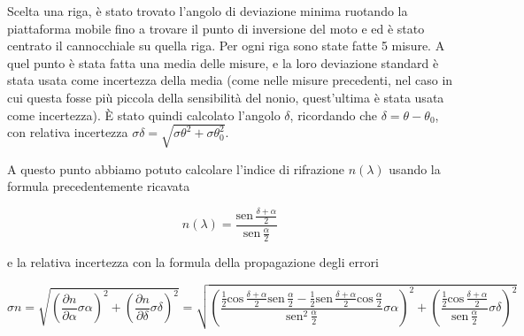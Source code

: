 \documentclass{article}
\begin{document}
Scelta una riga, è stato trovato l'angolo di deviazione minima ruotando la piattaforma mobile fino a trovare il punto di inversione del moto e ed è stato centrato il cannocchiale su quella riga. Per ogni riga sono state fatte 5 misure. A quel punto è stata fatta una media delle misure, e la loro deviazione standard è stata usata come incertezza della media (come nelle misure precedenti, nel caso in cui questa fosse più piccola della sensibilità del nonio, quest'ultima è stata usata come incertezza). È stato quindi calcolato l'angolo $\delta$, ricordando che $\delta = \theta - \theta _0$, con relativa incertezza $\sigma \delta = \sqrt{\sigma \theta ^2 + \sigma \theta_0 ^2}$.

A questo punto abbiamo potuto calcolare l'indice di rifrazione $n (\lambda)$ usando la formula precedentemente ricavata

\[n(\lambda) = \frac{\textrm{sen}\, \frac{\delta + \alpha}{2}}{\textrm{sen}\, \frac{\alpha}{2}}\]

 e la relativa incertezza con la formula della propagazione degli errori

\[\sigma n = \sqrt{\left( \frac{\partial n}{\partial \alpha}\sigma \alpha \right)^2 + \left( \frac{\partial n}{\partial \delta}\sigma \delta \right)^2} = \sqrt{\left( \frac{\frac{1}{2}\textrm{cos}\, \frac{\delta + \alpha}{2}\textrm{sen}\, \frac{\alpha}{2} - \frac{1}{2}\textrm{sen}\, \frac{\delta + \alpha}{2}\textrm{cos}\, \frac{\alpha}{2}}{\textrm{sen}^2\, \frac{\alpha}{2}} \sigma \alpha  \right)^2 + \left( \frac{\frac{1}{2}\textrm{cos}\, \frac{\delta + \alpha}{2}}{\textrm{sen}\, \frac{\alpha}{2}} \sigma \delta \right)^2}\]
\end{document}
